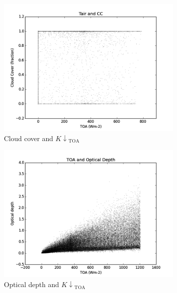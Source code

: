 \documentclass[a4paper,titlepage, twoside]{report}
\newcommand\Kdowntoa{{K\!\!\downarrow}_\mathrm{TOA}}
\begin{document}
\begin{figure}
\begin{subfigure}{0.48\textwidth}
\includegraphics[width=\textwidth]{015_TOA_CC.png}
\caption{Cloud cover and $\Kdowntoa$}
\end{subfigure}
\hfill
\begin{subfigure}{0.48\textwidth}
\includegraphics[width=\textwidth]{018_TOA_tau.png}
\caption{Optical depth and $\Kdowntoa$}
\end{subfigure}
\\
\begin{subfigure}{0.48\textwidth}

\end{subfigure}
\end{figure}
\end{document}
